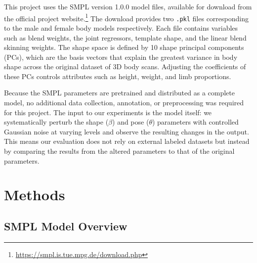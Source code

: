 \documentclass[final]{article}
\begin{document}
This project uses the SMPL version 1.0.0 model files, available for download from the official project website.\footnote{\url{https://smpl.is.tue.mpg.de/download.php}} The download provides two \texttt{.pkl} files corresponding to the male and female body models respectively. Each file contains variables such as blend weights, the joint regressors, template shape, and the linear blend skinning weights. The shape space is defined by 10 shape principal components (PCs), which are the basis vectors that explain the greatest variance in body shape across the original dataset of 3D body scans. Adjusting the coefficients of these PCs controls attributes such as height, weight, and limb proportions.

Because the SMPL parameters are pretrained and distributed as a complete model, no additional data collection, annotation, or preprocessing was required for this project. The input to our experiments is the model itself: we systematically perturb the shape ($\beta$) and pose ($\theta$) parameters with controlled Gaussian noise at varying levels and observe the resulting changes in the output. This means our evaluation does not rely on external labeled datasets but instead by comparing the results from the altered parameters to that of the original parameters.




\section{Methods}\label{sec:approach}
\subsection{SMPL Model Overview}
\end{document}
